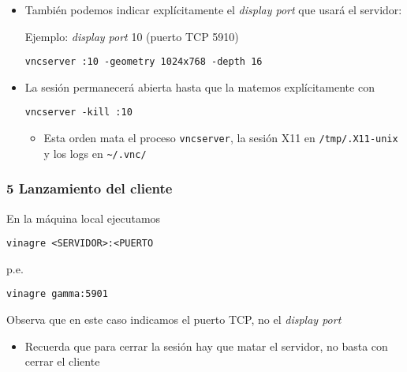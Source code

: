 \documentclass[ucs]{beamer}
\begin{document}
\begin{frame}[fragile]
\frametitle{}

\begin{itemize}
\item
También podemos indicar 
explícitamente el  \emph{display port}
que usará el servidor:


Ejemplo: 
\emph{display port} 10 (puerto TCP 5910)

\verb|vncserver :10 -geometry 1024x768 -depth 16|

\item
La sesión permanecerá abierta hasta que la matemos explícitamente
con


\verb|vncserver -kill :10|


\begin{itemize}
\item
Esta orden mata el proceso
\verb|vncserver|, la sesión X11 en 
\verb|/tmp/.X11-unix|
y los logs en 
\verb|~/.vnc/|

\end{itemize}
\end{itemize}





\end{frame}

\begin{frame}[fragile]
\frametitle{5 Lanzamiento del cliente}
En la máquina local ejecutamos

\verb|vinagre <SERVIDOR>:<PUERTO|

p.e.

\verb|vinagre gamma:5901|

Observa que en este caso indicamos el puerto TCP, no el \emph{display port}



\begin{itemize}
\item
Recuerda que para cerrar la sesión hay que matar el servidor, no basta
con cerrar el cliente
\end{itemize}



\end{frame}
\end{document}
